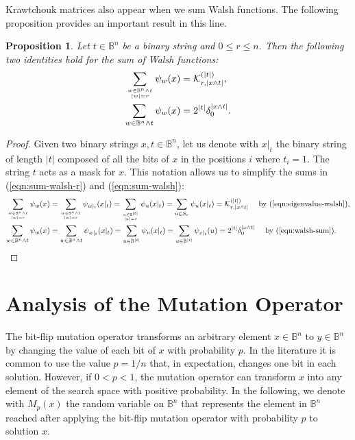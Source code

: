 \documentclass{article}
\newtheorem{proposition}{Proposition}
\newcommand{\Bo}[0]{\mathbb{B}}
\newcommand{\krawel}[3]{\mathcal{K}^{#1}_{#2,#3}}
\begin{document}
Krawtchouk matrices also appear when we sum Walsh functions. The following proposition provides an important result in this line.
\begin{proposition}
\label{prop:krawtchouk}
Let $t \in \Bo^n$ be a binary string and $0 \leq r \leq n$. Then the following two identities hold for the sum of Walsh functions:
\begin{align}
\label{eqn:sum-walsh-r}\sum_{w \in \Bo^n \wedge t \atop |w| = r} \psi_{w}(x) &= \krawel{(|t|)}{r}{|x \wedge t|} , \\
\label{eqn:sum-walsh}\sum_{w \in \Bo^n \wedge t} \psi_{w}(x) &= 2^{|t|} \delta_0^{|x \wedge t|} .
\end{align}
\end{proposition}
\begin{proof}
Given two binary strings $x, t \in \Bo^n$, let us denote with $x|_t$ the binary string of length $|t|$ composed of all the bits of $x$ in the positions $i$ where $t_i=1$. The string $t$ acts as a mask for $x$. This notation allows us to simplify the sums in (\ref{eqn:sum-walsh-r}) and (\ref{eqn:sum-walsh}):
\begin{align}
\sum_{w \in \Bo^n \wedge t \atop |w| = r} \psi_{w}(x) &= 
\sum_{w \in \Bo^n \wedge t \atop |w| = r} \psi_{w|_t}(x|_t) =
\sum_{u \in \Bo^{|t|} \atop |u| = r} \psi_{u}(x|_t) = \sum_{u \in S_r} \psi_{u}(x|_t) = \krawel{(|t|)}{r}{|x \wedge t|} ~~~~ \text{by (\ref{eqn:eigenvalue-walsh}),} \nonumber \\
\sum_{w \in \Bo^n \wedge t} \psi_{w}(x) &= 
\sum_{w \in \Bo^n \wedge t} \psi_{w|_t}(x|_t) =
\sum_{u \in \Bo^{|t|}} \psi_{u}(x|_t) = \sum_{u \in \Bo^{|t|}} \psi_{x|_t}(u) = 2^{|t|} \delta_0^{|x \wedge t|} ~~~~ \text{by (\ref{eqn:walsh-sum})} . \nonumber 
\end{align}


\end{proof}





\section{Analysis of the Mutation Operator}
\label{sec:mutation}

The bit-flip mutation operator transforms an arbitrary element $x \in \Bo^n$ to $y \in \Bo^n$ by changing the value of each bit of $x$ with probability $p$. In the literature it is common to use the value $p=1/n$ that, in expectation, changes one bit in each solution. However, if $0 < p < 1$, the mutation operator can transform $x$ into any element of the search space with positive probability. In the following, we denote with $M_p(x)$ the random variable on $\Bo^n$ that represents the element in $\Bo^n$ reached after applying the bit-flip mutation operator with probability $p$ to solution $x$.
\end{document}
